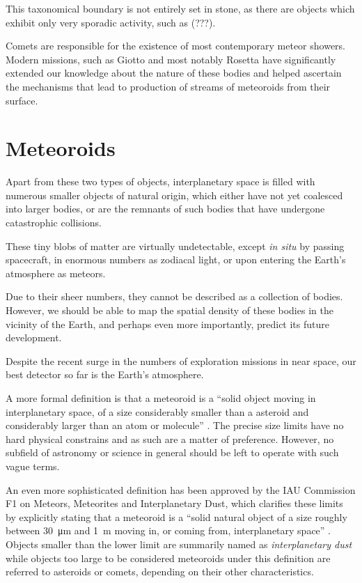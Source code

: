     This taxonomical boundary is not entirely set in stone, as there are objects which exhibit
    only very sporadic activity, such as (???).

    Comets are responsible for the existence of most contemporary meteor showers.
    Modern missions, such as Giotto and most notably Rosetta have significantly extended our knowledge
    about the nature of these bodies and helped ascertain the mechanisms that lead to production
    of streams of meteoroids from their surface.

\section{Meteoroids} \label{am}
    Apart from these two types of objects, interplanetary space is filled with numerous smaller objects
    of natural origin, which either have not yet coalesced into larger bodies, or are the remnants
    of such bodies that have undergone catastrophic collisions.

    These tiny blobs of matter are virtually undetectable, except \textit{in situ} by passing spacecraft,
    in enormous numbers as zodiacal light, or upon entering the Earth's atmosphere as meteors.

    Due to their sheer numbers, they cannot be described as a collection of bodies.
    However, we should be able to map the spatial density of these bodies in the vicinity of the Earth,
    and perhaps even more importantly, predict its future development.

    Despite the recent surge in the numbers of exploration missions in near space,
    our best detector so far is the Earth's atmosphere.



    A more formal definition is that a meteoroid is a ``solid object moving in interplanetary space,
    of a size considerably smaller than a asteroid and considerably larger than an atom or molecule'' \citep{imo-glossary}.
    The precise size limits have no hard physical constrains and as such are a matter of preference.
    However, no subfield of astronomy or science in general should be left to operate with such vague terms.

    An even more sophisticated definition has been approved by the IAU Commission F1 on Meteors, Meteorites and Interplanetary Dust,
    which clarifies these limits by explicitly stating that a meteoroid is a ``solid natural object
    of a size roughly between \SI{30}{\micro\metre} and \SI{1}{\metre} moving in, or coming from, interplanetary space'' \citep{imo-definitions}.
    Objects smaller than the lower limit are summarily named as \emph{interplanetary dust} while objects
    too large to be considered meteoroids under this definition are referred to
    asteroids or comets, depending on their other characteristics.

